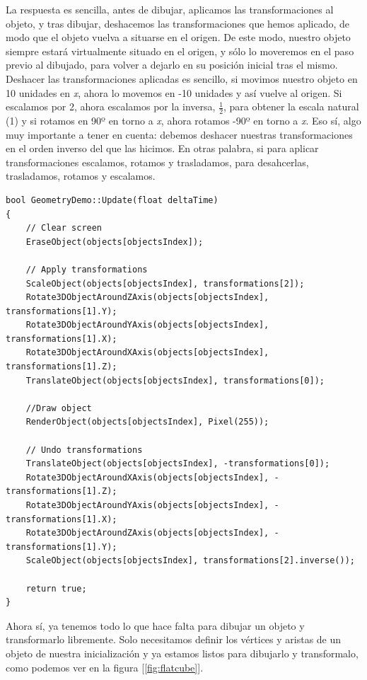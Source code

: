 La respuesta es sencilla, antes de dibujar, aplicamos las transformaciones al objeto, y tras dibujar, deshacemos las transformaciones que hemos aplicado, de modo que el objeto vuelva a situarse en el origen. De este modo, nuestro objeto siempre estará virtualmente situado en el origen, y sólo lo moveremos en el paso previo al dibujado, para volver a dejarlo en su posición inicial tras el mismo. Deshacer las transformaciones aplicadas es sencillo, si movimos nuestro objeto en 10 unidades en \emph{x}, ahora lo movemos en -10 unidades y así vuelve al origen. Si escalamos por 2, ahora escalamos por la inversa, \(\frac{1}{2}\), para obtener la escala natural (1) y si rotamos en 90º en torno a \emph{x}, ahora rotamos -90º en torno a \emph{x}. Eso sí, algo muy importante a tener en cuenta: debemos deshacer nuestras transformaciones en el orden inverso del que las hicimos. En otras palabra, si para aplicar transformaciones escalamos, rotamos y trasladamos, para desahcerlas, trasladamos, rotamos y escalamos.\\

\begin{lstlisting}[style=C-color, caption={Ciclo de actualización de un objeto en pantalla}, label=cod:update]
bool GeometryDemo::Update(float deltaTime)
{
	// Clear screen
    EraseObject(objects[objectsIndex]);
    
    // Apply transformations
    ScaleObject(objects[objectsIndex], transformations[2]);
    Rotate3DObjectAroundZAxis(objects[objectsIndex], transformations[1].Y);
    Rotate3DObjectAroundYAxis(objects[objectsIndex], transformations[1].X);
    Rotate3DObjectAroundXAxis(objects[objectsIndex], transformations[1].Z);
    TranslateObject(objects[objectsIndex], transformations[0]);
    
    //Draw object
    RenderObject(objects[objectsIndex], Pixel(255));
    
    // Undo transformations
    TranslateObject(objects[objectsIndex], -transformations[0]);
    Rotate3DObjectAroundXAxis(objects[objectsIndex], -transformations[1].Z);
    Rotate3DObjectAroundYAxis(objects[objectsIndex], -transformations[1].X);
    Rotate3DObjectAroundZAxis(objects[objectsIndex], -transformations[1].Y);
    ScaleObject(objects[objectsIndex], transformations[2].inverse());

    return true;
}
\end{lstlisting}

Ahora sí, ya tenemos todo lo que hace falta para dibujar un objeto y transformarlo libremente. Solo necesitamos definir los vértices y aristas de un objeto de nuestra inicialización y ya estamos listos para dibujarlo y transformalo, como podemos ver en la figura [\ref{fig:flatcube}].\\

